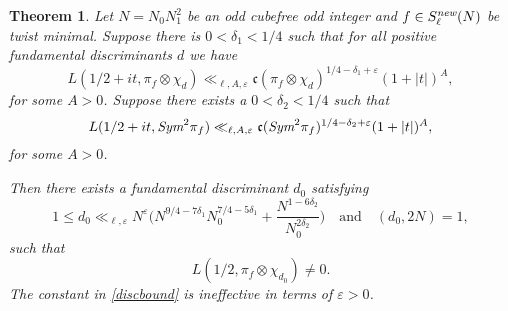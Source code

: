 \documentclass[12pt,reqno]{amsart}
\theoremstyle{plain}
\newtheorem{theorem}{Theorem}
\theoremstyle{remark}
\numberwithin{equation}{section}
\numberwithin{lemma}{section}
\numberwithin{theorem}{section}
\numberwithin{prop}{section}
\numberwithin{remark}{section}
\begin{document}
\begin{theorem} \label{mainthm}
Let $N=N_0 N_1^2$ be an odd cubefree odd integer
and $f \in S^{\emph{new}}_{\ell}(N)$ be twist minimal. Suppose there is $0<\delta_1<1/4$ 
such that for all positive fundamental discriminants $d$ we have 
\begin{equation} \label{GL2lindsub}
L(1/2+it,\pi_f \otimes \chi_{d}) \ll_{\ell,A,\varepsilon}  
\mathfrak{c}(\pi_f \otimes \chi_d)^{1/4-\delta_1+\varepsilon} (1+|t|)^{A},
\end{equation}
for some $A>0$. Suppose there exists a $0<\delta_2<1/4$ such that 
\begin{equation} \label{symsub}
L(1/2+it,\emph{Sym}^2 \pi_f)  \ll_{\ell,A,\varepsilon} \mathfrak{c}(\emph{Sym}^2 \pi_f)^{1/4-\delta_2+\varepsilon} (1+|t|)^{A},
\end{equation}
for some $A>0$.

Then there exists a fundamental discriminant $d_0$ satisfying
\begin{equation} \label{discbound}
1 \leq d_0 \ll_{\ell,\varepsilon} N^{\varepsilon} \Big( N^{9/4-7 \delta_1} N_0^{7/4-5 \delta_1}
+\frac{N^{1-6 \delta_2  }}{N_0^{2 \delta_2}}  \Big)
\quad \text{and} \quad (d_0,2N)=1, 
\end{equation}
such that
\begin{equation*}
L(1/2,\pi_f \otimes \chi_{d_0}) \neq 0.
\end{equation*}
The constant in \eqref{discbound} is ineffective in terms of $\varepsilon>0$.
\end{theorem}
\end{document}
